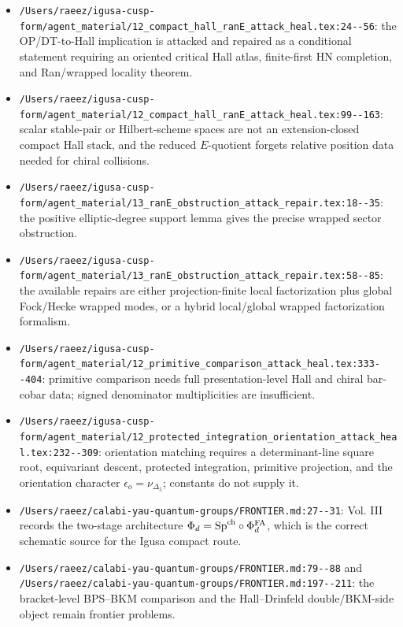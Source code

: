 \begin{itemize}
\item \verb|/Users/raeez/igusa-cusp-form/agent_material/12_compact_hall_ranE_attack_heal.tex:24--56|:
the OP/DT-to-Hall implication is attacked and repaired as a conditional
statement requiring an oriented critical Hall atlas, finite-first HN
completion, and Ran/wrapped locality theorem.

\item \verb|/Users/raeez/igusa-cusp-form/agent_material/12_compact_hall_ranE_attack_heal.tex:99--163|:
scalar stable-pair or Hilbert-scheme spaces are not an extension-closed
compact Hall stack, and the reduced \(E\)-quotient forgets relative
position data needed for chiral collisions.

\item \verb|/Users/raeez/igusa-cusp-form/agent_material/13_ranE_obstruction_attack_repair.tex:18--35|:
the positive elliptic-degree support lemma gives the precise wrapped
sector obstruction.

\item \verb|/Users/raeez/igusa-cusp-form/agent_material/13_ranE_obstruction_attack_repair.tex:58--85|:
the available repairs are either projection-finite local factorization
plus global Fock/Hecke wrapped modes, or a hybrid local/global wrapped
factorization formalism.

\item \verb|/Users/raeez/igusa-cusp-form/agent_material/12_primitive_comparison_attack_heal.tex:333--404|:
primitive comparison needs full presentation-level Hall and chiral
bar-cobar data; signed denominator multiplicities are insufficient.

\item \verb|/Users/raeez/igusa-cusp-form/agent_material/12_protected_integration_orientation_attack_heal.tex:232--309|:
orientation matching requires a determinant-line square root, equivariant
descent, protected integration, primitive projection, and the orientation
character \(\epsilon_o=\nu_{\Delta_5}\); constants do not supply it.

\item \verb|/Users/raeez/calabi-yau-quantum-groups/FRONTIER.md:27--31|:
Vol. III records the two-stage architecture
\(\Phi_d=\mathrm{Sp}^{\mathrm{ch}}\circ\Phi^{\mathrm{FA}}_d\), which is the correct schematic source for
the Igusa compact route.

\item \verb|/Users/raeez/calabi-yau-quantum-groups/FRONTIER.md:79--88| and
\verb|/Users/raeez/calabi-yau-quantum-groups/FRONTIER.md:197--211|:
the bracket-level BPS--BKM comparison and the Hall--Drinfeld
double/BKM-side object remain frontier problems.


\end{itemize}
